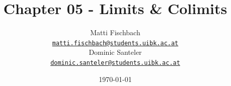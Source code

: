 \documentclass{tcsseminar}
\begin{document}
\title{Chapter 05 - Limits \& Colimits}
\author{Matti Fischbach \\
  {\normalsize \href{mailto:matti.fischbach@students.uibk.ac.at}{\texttt{matti.fischbach@students.uibk.ac.at}}} \\
  Dominic Santeler \\
  {\normalsize \href{mailto:dominic.santeler@students.uibk.ac.at}{\texttt{dominic.santeler@students.uibk.ac.at}}}}
\date{\today}
\abstract{}
\maketitle
\tableofcontents




\appendix

\end{document}
